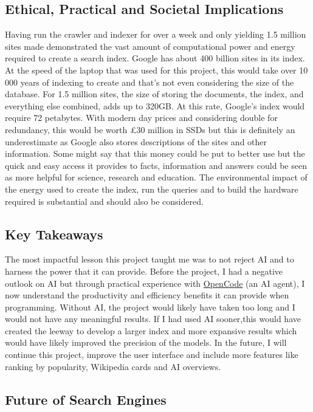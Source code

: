 \documentclass[12pt,a4paper]{article}
\begin{document}
\subsection*{Ethical, Practical and Societal Implications}

Having run the crawler and indexer for over a week and only yielding 1.5 million
sites made demonstrated the vast amount of computational power and energy
required to create a search index. Google has about 400 billion sites in its
index. At the speed of the laptop that was used for this project, this would
take over 10 000 years of indexing to create and that's not even considering the
size of the database. For 1.5 million sites, the size of storing the documents,
the index, and everything else combined, adds up to 320GB. At this rate,
Google's index would require 72 petabytes. With modern day prices and
considering double for redundancy, this would be worth £30 million in SSDs but
this is definitely an underestimate as Google also stores descriptions of the
sites and other information. Some might say that this money could be put to
better use but the quick and easy access it provides to facts, information and
answers could be seen as more helpful for science, research and education.
The environmental impact of the energy used to create the index, run the queries
and to build the hardware required is substantial and should also be considered.

\subsection*{Key Takeaways}

The most impactful lesson this project taught me was to not reject AI and to
harness the power that it can provide. Before the project, I had a negative
outlook on AI but through practical experience with
\href{https://opencode.ai}{OpenCode} (an AI agent), I now understand the
productivity and efficiency benefits it can provide when programming. Without
AI, the project would likely have taken too long and I would not have any
meaningful results. If I had used AI sooner,this would have created the leeway
to develop a larger index and more expansive results which would have likely
improved the precision of the models. In the future, I will continue this
project, improve the user interface and include more features like ranking by
popularity, Wikipedia cards and AI overviews.

\subsection*{Future of Search Engines}
\end{document}
